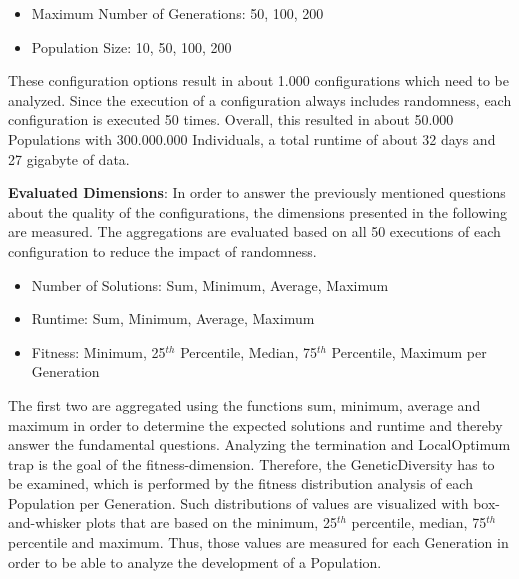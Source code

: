 \begin{itemize}
\item Maximum Number of Generations: 50, 100, 200
\item Population Size: 10, 50, 100, 200
\end{itemize}

These configuration options result in about 1.000 configurations which need to be analyzed. Since the execution of a configuration always includes randomness, each configuration is executed 50 times. Overall, this resulted in about 50.000 \glspl{Population} with 300.000.000 \glspl{Individual}, a total runtime of about 32 days and 27 gigabyte of data.

\textbf{Evaluated Dimensions}: In order to answer the previously mentioned questions about the quality of the configurations, the dimensions presented in the following are measured. The aggregations are evaluated based on all 50 executions of each configuration to reduce the impact of randomness.
\begin{itemize}
\item Number of Solutions: Sum, Minimum, Average, Maximum %
\item Runtime: Sum, Minimum, Average, Maximum %
\item Fitness: Minimum, 25$^{th}$ Percentile, Median, 75$^{th}$ Percentile, Maximum per \gls{Generation} %
\end{itemize}
The first two are aggregated using the functions sum, minimum, average and maximum in order to determine the expected solutions and runtime and thereby answer the fundamental questions. Analyzing the termination and \gls{LocalOptimum} trap is the goal of the fitness-dimension. Therefore, the \gls{GeneticDiversity} has to be examined, which is performed by the fitness distribution analysis of each \gls{Population} per \gls{Generation}. Such distributions of values are visualized with box-and-whisker plots that are based on the minimum, 25$^{th}$ percentile, median, 75$^{th}$ percentile and maximum. Thus, those values are measured for each \gls{Generation} in order to be able to analyze the development of a \gls{Population}.


